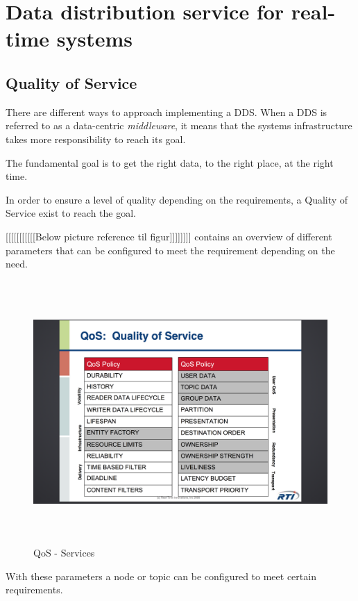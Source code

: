 \section{Data distribution service for real-time systems}

\subsection{Quality of Service}

There are different ways to approach implementing a DDS. When a DDS is referred to as a data-centric \emph{middleware}, it means that the systems infrastructure takes more responsibility to reach its goal.

The fundamental goal is to get the right data, to the right place, at the right time.

In order to ensure a level of quality depending on the requirements, a Quality of Service exist to reach the goal.

[[[[[[[[[[[Below picture reference til figur]]]]]]]] contains an overview of different parameters that can be configured to meet the requirement depending on the need.

\begin{figure}[h]
\centering
\includegraphics[height=100mm, keepaspectratio]{img/dds_question_4-6/QoS_services}
\caption{QoS - Services}
\label{QoS - Services}
\end{figure}

\newpage

With these parameters a node or topic can be configured to meet certain requirements.

